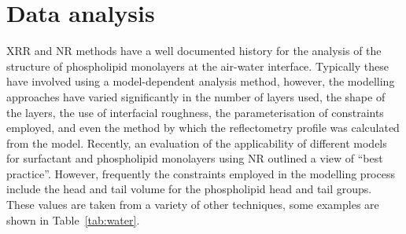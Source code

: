 \section{Data analysis}
\label{refl1:anal}
XRR and NR methods have a well documented history for the analysis of the structure of phospholipid monolayers at the air-water interface.\autocite{mohwald_phospholipid_1990,kewalramani_effects_2010,bayerl_specular_1990,johnson_structure_1991,clifton_role_2012,helm_phospholipid_1987,daillant_x-ray_1990}
Typically these have involved using a model-dependent analysis method, however, the modelling approaches have varied significantly in the number of layers used, the shape of the layers, the use of interfacial roughness, the parameterisation of constraints employed, and even the method by which the reflectometry profile was calculated from the model.
Recently, an evaluation of the applicability of different models for surfactant and phospholipid monolayers using NR outlined a view of ``best practice''.\autocite{campbell_structure_2018}
However, frequently the constraints employed in the modelling process include the head and tail volume for the phospholipid head and tail groups.
These values are taken from a variety of other techniques, some examples are shown in Table~\ref{tab:water}.
%
